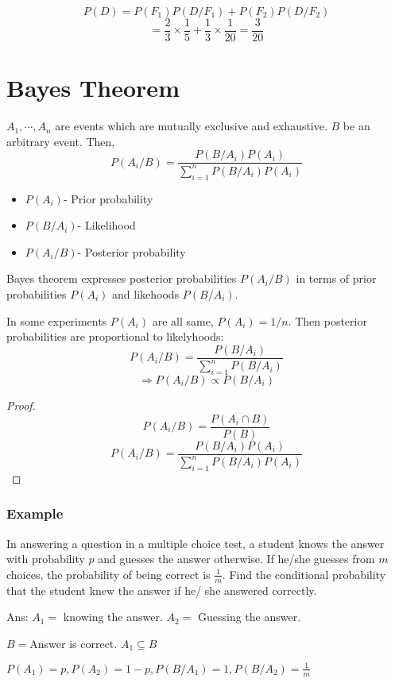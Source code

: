 \documentclass{article}
\begin{document}
$$ P(D)=P(F_1)P(D/F_1)+P(F_2)P(D/F_2)$$
$$ = \frac{2}{3} \times \frac{1}{5} + \frac{1}{3} \times \frac{1}{20} = \frac{3}{20}$$


\section{Bayes Theorem}
$A_1, \cdots, A_n $ are events which are mutually exclusive and exhaustive.
$B$ be an arbitrary event. Then,
$$ P(A_i/B)= \frac{P(B/A_i)P(A_i)}{\sum_{i=1}^n P(B/A_i)P(A_i)}$$

\begin{itemize}
    \item $P(A_i)$- Prior probability
    \item $P(B/A_i)$- Likelihood
    \item $P(A_i/B)$- Posterior probability
\end{itemize}

Bayes theorem expresses posterior probabilities $P(A_i/B)$ in terms of prior probabilities  $P(A_i)$ and likehoods  $P(B/A_i)$.

In some experiments $P(A_i)$ are all same, $P(A_i)=1/n$. Then posterior probabilities are proportional to likelyhoods:
$$ P(A_i/B)= \frac{P(B/A_i)}{\sum_{i=1}^n P(B/A_i)}$$
$$ \Rightarrow P(A_i/B) \propto P(B/A_i)$$

\begin{proof}

    $$ P(A_i/B) = \frac{P(A_i \cap B)}{P(B)}$$
    $$ P(A_i/B)= \frac{P(B/A_i)P(A_i)}{\sum_{i=1}^{n} P(B/A_i)P(A_i)}$$

\end{proof}

\subsubsection{Example}
In answering a question in a multiple choice test, a student knows the answer with probability $p$ and guesses the answer otherwise. If he/she guesses from $m$ choices, the probability of being correct is $\frac{1}{m}$. Find the conditional probability that the student knew the answer if he/ she answered correctly.

Ans: $A_1=$ knowing the answer. $A_2=$ Guessing the answer.

$B= $Answer is correct. $A_1 \subseteq B$

$P(A_1)= p, P(A_2)= 1-p, P(B/A_1)= 1, P(B/A_2)= \frac{1}{m}$
\end{document}
